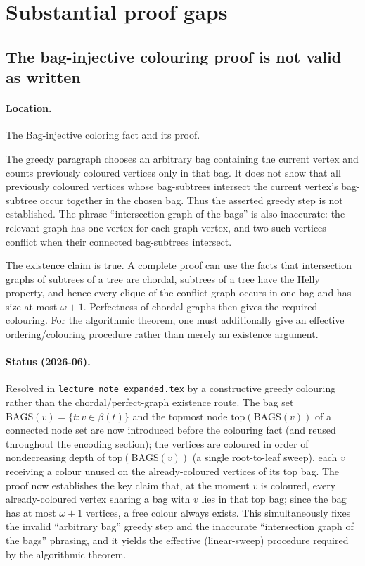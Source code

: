 \documentclass[11pt]{article}
\newcommand{\Bags}{\ensuremath{\mathrm{BAGS}}}
\begin{document}
\section{Substantial proof gaps}

\subsection{The bag-injective colouring proof is not valid as written}

\paragraph{Location.} The Bag-injective coloring fact and its proof.

The greedy paragraph chooses an arbitrary bag containing the current vertex
and counts previously coloured vertices only in that bag.  It does not show
that all previously coloured vertices whose bag-subtrees intersect the current
vertex's bag-subtree occur together in the chosen bag.  Thus the asserted
greedy step is not established.  The phrase ``intersection graph of the bags''
is also inaccurate: the relevant graph has one vertex for each graph vertex,
and two such vertices conflict when their connected bag-subtrees intersect.

The existence claim is true.  A complete proof can use the facts that
intersection graphs of subtrees of a tree are chordal, subtrees of a tree have
the Helly property, and hence every clique of the conflict graph occurs in one
bag and has size at most \(\omega+1\).  Perfectness of chordal graphs then gives
the required colouring.  For the algorithmic theorem, one must additionally
give an effective ordering/colouring procedure rather than merely an existence
argument.

\paragraph{Status (2026-06).} Resolved in \texttt{lecture\_note\_expanded.tex}
by a constructive greedy colouring rather than the chordal/perfect-graph
existence route.  The bag set \(\Bags(v)=\{t:v\in\beta(t)\}\) and the topmost node
\(\mathrm{top}(\Bags(v))\) of a connected node set are now introduced before the
colouring fact (and reused throughout the encoding section); the vertices are
coloured in order of nondecreasing depth of \(\mathrm{top}(\Bags(v))\) (a single
root-to-leaf sweep), each \(v\) receiving a colour unused on the already-coloured
vertices of its top bag.  The proof now establishes the key claim that, at the
moment \(v\) is coloured, every already-coloured vertex sharing a bag with \(v\)
lies in that top bag; since the bag has at most \(\omega+1\) vertices, a free
colour always exists.  This simultaneously fixes the invalid ``arbitrary bag''
greedy step and the inaccurate ``intersection graph of the bags'' phrasing, and
it yields the effective (linear-sweep) procedure required by the algorithmic
theorem.
\end{document}
